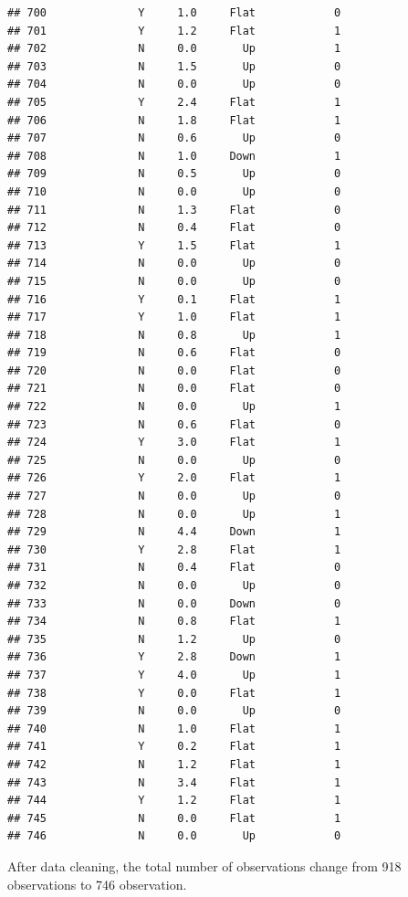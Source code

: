\documentclass[
]{article}
\begin{document}
\begin{verbatim}
## 700              Y     1.0     Flat            0
## 701              Y     1.2     Flat            1
## 702              N     0.0       Up            1
## 703              N     1.5       Up            0
## 704              N     0.0       Up            0
## 705              Y     2.4     Flat            1
## 706              N     1.8     Flat            1
## 707              N     0.6       Up            0
## 708              N     1.0     Down            1
## 709              N     0.5       Up            0
## 710              N     0.0       Up            0
## 711              N     1.3     Flat            0
## 712              N     0.4     Flat            0
## 713              Y     1.5     Flat            1
## 714              N     0.0       Up            0
## 715              N     0.0       Up            0
## 716              Y     0.1     Flat            1
## 717              Y     1.0     Flat            1
## 718              N     0.8       Up            1
## 719              N     0.6     Flat            0
## 720              N     0.0     Flat            0
## 721              N     0.0     Flat            0
## 722              N     0.0       Up            1
## 723              N     0.6     Flat            0
## 724              Y     3.0     Flat            1
## 725              N     0.0       Up            0
## 726              Y     2.0     Flat            1
## 727              N     0.0       Up            0
## 728              N     0.0       Up            1
## 729              N     4.4     Down            1
## 730              Y     2.8     Flat            1
## 731              N     0.4     Flat            0
## 732              N     0.0       Up            0
## 733              N     0.0     Down            0
## 734              N     0.8     Flat            1
## 735              N     1.2       Up            0
## 736              Y     2.8     Down            1
## 737              Y     4.0       Up            1
## 738              Y     0.0     Flat            1
## 739              N     0.0       Up            0
## 740              N     1.0     Flat            1
## 741              Y     0.2     Flat            1
## 742              N     1.2     Flat            1
## 743              N     3.4     Flat            1
## 744              Y     1.2     Flat            1
## 745              N     0.0     Flat            1
## 746              N     0.0       Up            0
\end{verbatim}

After data cleaning, the total number of observations change from 918
observations to 746 observation.
\end{document}

